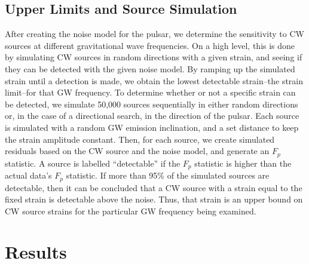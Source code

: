 \documentclass[12pt]{article}
\begin{document}
\subsection{Upper Limits and Source Simulation}

After creating the noise model for the pulsar, we determine the sensitivity to
CW sources at different gravitational wave frequencies. On a high level, this
is done by simulating CW sources in random directions with a given strain, and
seeing if they can be detected with the given noise model. By ramping up the
simulated strain until a detection is made, we obtain the lowest detectable
strain--the strain limit--for that GW frequency. To determine whether or not a
specific strain can be detected, we simulate 50,000 sources sequentially in
either random directions or, in the case of a directional search, in the
direction of the pulsar. Each source is simulated with a random GW emission inclination,
and a set distance to keep the strain amplitude constant. Then, for each
source, we create simulated residuals based on the CW source and the noise
model, and generate an $F_p$ statistic. A source is labelled ``detectable'' if the
$F_p$ statistic is higher than the actual data's $F_p$ statistic. If more than 95\% of
the simulated sources are detectable, then it can be concluded that a CW source
with a strain equal to the fixed strain is detectable above the noise. Thus,
that strain is an upper bound on CW source strains for the particular GW
frequency being examined.

\section{Results}
\end{document}
